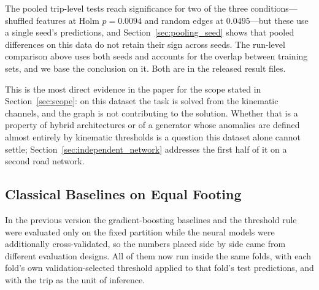 \documentclass[journal]{IEEEtran}
\begin{document}
The pooled trip-level tests reach significance for two of the three
conditions---shuffled features at Holm $p = 0.0094$ and random edges at
$0.0495$---but these use a single seed's predictions, and
Section~\ref{sec:pooling_seed} shows that pooled differences on this data do
not retain their sign across seeds. The run-level comparison above uses both
seeds and accounts for the overlap between training sets, and we base the
conclusion on it. Both are in the released result files.

This is the most direct evidence in the paper for the scope stated in
Section~\ref{sec:scope}: on this dataset the task is solved from the kinematic
channels, and the graph is not contributing to the solution. Whether that is a
property of hybrid architectures or of a generator whose anomalies are defined
almost entirely by kinematic thresholds is a question this dataset alone
cannot settle; Section~\ref{sec:independent_network} addresses the first half
of it on a second road network.

\subsection{Classical Baselines on Equal Footing}
\label{sec:classic_cv}
In the previous version the gradient-boosting baselines and the
threshold rule were evaluated only on the fixed partition while the neural
models were additionally cross-validated, so the numbers placed side by side
came from different evaluation designs. All of them now run inside the same
folds, with each fold's own validation-selected threshold applied to that
fold's test predictions, and with the trip as the unit of inference.
\end{document}
